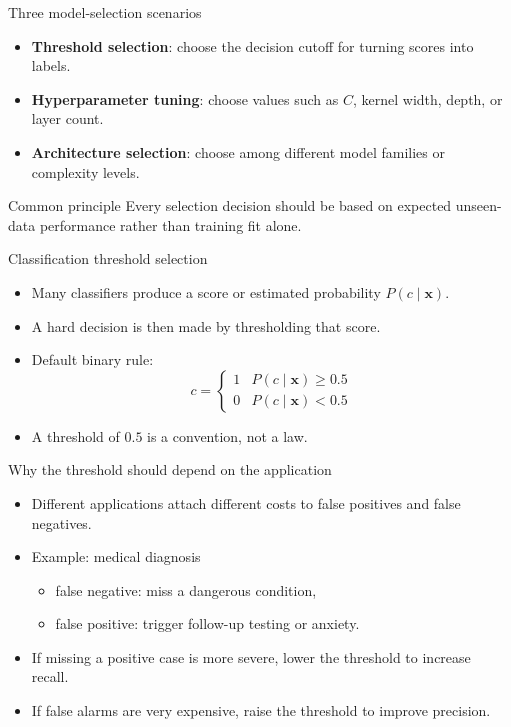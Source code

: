 \documentclass[12pt]{beamer}
\begin{document}
\begin{frame}{Three model-selection scenarios}
  \begin{itemize}
    \item \textbf{Threshold selection}: choose the decision cutoff for turning scores into labels.
    \item \textbf{Hyperparameter tuning}: choose values such as $C$, kernel width, depth, or layer count.
    \item \textbf{Architecture selection}: choose among different model families or complexity levels.
  \end{itemize}
  \begin{conceptbox}{Common principle}
    Every selection decision should be based on expected unseen-data performance rather than training fit alone.
  \end{conceptbox}
\end{frame}

\begin{frame}{Classification threshold selection}
  \begin{itemize}
    \item Many classifiers produce a score or estimated probability $P(c\mid\bm{x})$.
    \item A hard decision is then made by thresholding that score.
    \item Default binary rule:
      \[
        c =
        \begin{cases}
          1 & P(c\mid\bm{x}) \geq 0.5 \\
          0 & P(c\mid\bm{x}) < 0.5
        \end{cases}
      \]
    \item A threshold of $0.5$ is a convention, not a law.
  \end{itemize}
\end{frame}

\begin{frame}{Why the threshold should depend on the application}
  \begin{itemize}
    \item Different applications attach different costs to false positives and false negatives.
    \item Example: medical diagnosis
      \begin{itemize}
        \item false negative: miss a dangerous condition,
        \item false positive: trigger follow-up testing or anxiety.
      \end{itemize}
    \item If missing a positive case is more severe, lower the threshold to increase recall.
    \item If false alarms are very expensive, raise the threshold to improve precision.
  \end{itemize}
\end{frame}
\end{document}
